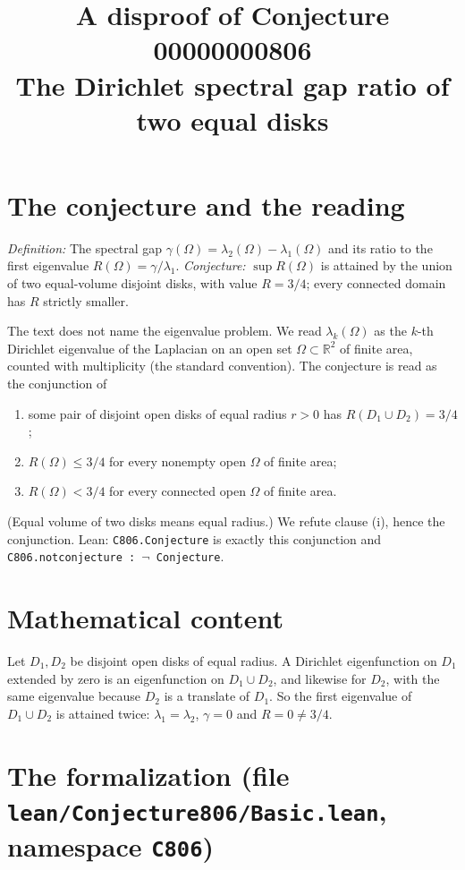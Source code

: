 \documentclass[11pt]{article}
\title{A disproof of Conjecture 00000000806\\[2pt]
\large The Dirichlet spectral gap ratio of two equal disks}
\date{}
\renewcommand{\_}{\oldus\allowbreak}
\theoremstyle{definition}
\theoremstyle{remark}
\begin{document}
\sloppy
\maketitle

\section{The conjecture and the reading}

\emph{Definition:} The spectral gap $\gamma(\Omega)=\lambda_2(\Omega)-\lambda_1(\Omega)$ and its ratio to the
first eigenvalue $R(\Omega)=\gamma/\lambda_1$.
\emph{Conjecture:} $\sup R(\Omega)$ is attained by the union of two equal-volume disjoint disks, with value
$R=3/4$; every connected domain has $R$ strictly smaller.

The text does not name the eigenvalue problem. We read $\lambda_k(\Omega)$ as the $k$-th Dirichlet
eigenvalue of the Laplacian on an open set $\Omega\subset\mathbb R^2$ of finite area, counted with
multiplicity (the standard convention). The conjecture is read as the conjunction of
\begin{enumerate}[label=(\roman*)]
  \item some pair of disjoint open disks of equal radius $r>0$ has $R(D_1\cup D_2)=3/4$;
  \item $R(\Omega)\le 3/4$ for every nonempty open $\Omega$ of finite area;
  \item $R(\Omega)<3/4$ for every connected open $\Omega$ of finite area.
\end{enumerate}
(Equal volume of two disks means equal radius.) We refute clause (i), hence the conjunction. Lean:
\texttt{C806.Conjecture} is exactly this conjunction and \texttt{C806.not\_conjecture : $\neg$ Conjecture}.

\section{Mathematical content}

Let $D_1,D_2$ be disjoint open disks of equal radius. A Dirichlet eigenfunction on $D_1$ extended by zero
is an eigenfunction on $D_1\cup D_2$, and likewise for $D_2$, with the same eigenvalue because $D_2$ is a
translate of $D_1$. So the first eigenvalue of $D_1\cup D_2$ is attained twice: $\lambda_1=\lambda_2$,
$\gamma=0$ and $R=0\neq 3/4$.

\section{The formalization (file \texttt{lean/Conjecture806/Basic.lean}, namespace \texttt{C806})}
\end{document}

